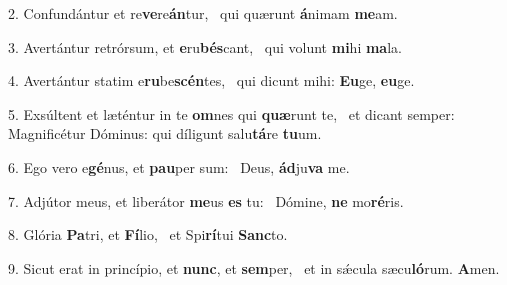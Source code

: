 2. Confundántur et re\textbf{ve}re\textbf{án}tur, \ast\  qui quærunt \textbf{á}nimam \textbf{me}am.\

3. Avertántur retrórsum, et \textbf{e}ru\textbf{bés}cant, \ast\  qui volunt \textbf{mi}hi \textbf{ma}la.\

4. Avertántur statim e\textbf{ru}be\textbf{scén}tes, \ast\  qui dicunt mihi: \textbf{Eu}ge, \textbf{eu}ge.\

5. Exsúltent et læténtur in te \textbf{om}nes qui \textbf{quæ}runt te, \ast\  et dicant semper: Magnificétur Dóminus: qui díligunt salu\textbf{tá}re \textbf{tu}um.\

6. Ego vero e\textbf{gé}nus, et \textbf{pau}per sum: \ast\  Deus, \textbf{ád}ju\textbf{va} me.\

7. Adjútor meus, et liberátor \textbf{me}us \textbf{es} tu: \ast\  Dómine, \textbf{ne} mo\textbf{ré}ris.\

8. Glória \textbf{Pa}tri, et \textbf{Fí}lio, \ast\  et Spi\textbf{rí}tui \textbf{Sanc}to.\

9. Sicut erat in princípio, et \textbf{nunc}, et \textbf{sem}per, \ast\  et in sǽcula sæcu\textbf{ló}rum. \textbf{A}men.\

